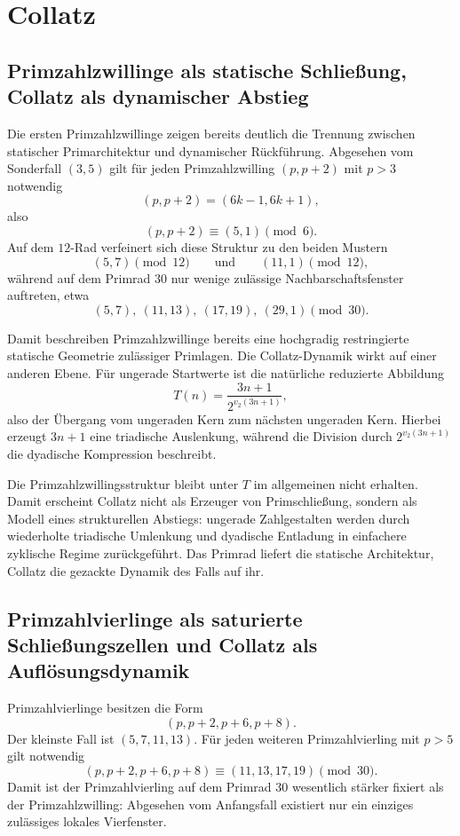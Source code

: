 \documentclass[11pt,a4paper]{article}
\theoremstyle{definition}
\begin{document}
\section{Collatz}
\subsection{Primzahlzwillinge als statische Schlie\ss ung, Collatz als dynamischer Abstieg}

Die ersten Primzahlzwillinge zeigen bereits deutlich die Trennung
zwischen statischer Primarchitektur und dynamischer R\"uckf\"uhrung.
Abgesehen vom Sonderfall $(3,5)$ gilt f\"ur jeden Primzahlzwilling
$(p,p+2)$ mit $p>3$ notwendig
\[
(p,p+2)=(6k-1,6k+1),
\]
also
\[
(p,p+2)\equiv (5,1)\pmod 6.
\]
Auf dem $12$-Rad verfeinert sich diese Struktur zu den beiden Mustern
\[
(5,7)\pmod{12}
\qquad\text{und}\qquad
(11,1)\pmod{12},
\]
w\"ahrend auf dem Primrad $30$ nur wenige zul\"assige Nachbarschaftsfenster
auftreten, etwa
\[
(5,7),\ (11,13),\ (17,19),\ (29,1)\pmod{30}.
\]

Damit beschreiben Primzahlzwillinge bereits eine hochgradig restringierte
statische Geometrie zul\"assiger Primlagen. Die Collatz-Dynamik wirkt auf
einer anderen Ebene. F\"ur ungerade Startwerte ist die nat\"urliche
reduzierte Abbildung
\[
T(n)=\frac{3n+1}{2^{v_2(3n+1)}},
\]
also der \"Ubergang vom ungeraden Kern zum n\"achsten ungeraden Kern.
Hierbei erzeugt $3n+1$ eine triadische Auslenkung, w\"ahrend die Division
durch $2^{v_2(3n+1)}$ die dyadische Kompression beschreibt.

Die Primzahlzwillingsstruktur bleibt unter $T$ im allgemeinen nicht
erhalten. Damit erscheint Collatz nicht als Erzeuger von Primschlie\ss ung,
sondern als Modell eines strukturellen Abstiegs: ungerade Zahlgestalten
werden durch wiederholte triadische Umlenkung und dyadische Entladung in
einfachere zyklische Regime zur\"uckgef\"uhrt. Das Primrad liefert die
statische Architektur, Collatz die gezackte Dynamik des Falls auf ihr.

\subsection{Primzahlvierlinge als saturierte Schlie\ss ungszellen und Collatz als Aufl\"osungsdynamik}

Primzahlvierlinge besitzen die Form
\[
(p,p+2,p+6,p+8).
\]
Der kleinste Fall ist $(5,7,11,13)$. F\"ur jeden weiteren Primzahlvierling
mit $p>5$ gilt notwendig
\[
(p,p+2,p+6,p+8)\equiv (11,13,17,19)\pmod{30}.
\]
Damit ist der Primzahlvierling auf dem Primrad $30$ wesentlich st\"arker
fixiert als der Primzahlzwilling: Abgesehen vom Anfangsfall existiert nur
ein einziges zul\"assiges lokales Vierfenster.
\end{document}
